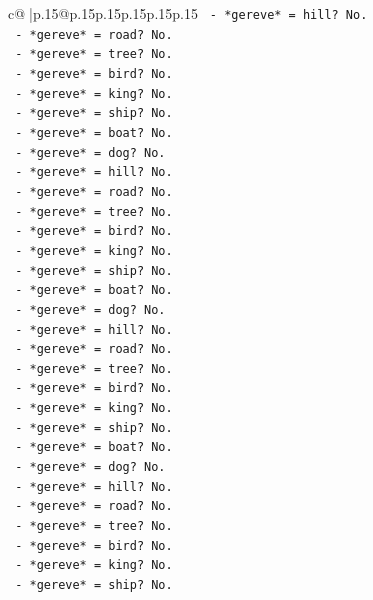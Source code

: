 \documentclass{article}
\begin{document}
{\begin{supertabular}{c@{$\;$}|p{.15\linewidth}@{}p{.15\linewidth}p{.15\linewidth}p{.15\linewidth}p{.15\linewidth}p{.15\linewidth}}
{{{\texttt{            {-} *gereve* = hill? No.} \\
\texttt{            {-} *gereve* = road? No.} \\
\texttt{            {-} *gereve* = tree? No.} \\
\texttt{            {-} *gereve* = bird? No.} \\
\texttt{            {-} *gereve* = king? No.} \\
\texttt{            {-} *gereve* = ship? No.} \\
\texttt{            {-} *gereve* = boat? No.} \\
\texttt{            {-} *gereve* = dog? No.} \\
\texttt{            {-} *gereve* = hill? No.} \\
\texttt{            {-} *gereve* = road? No.} \\
\texttt{            {-} *gereve* = tree? No.} \\
\texttt{            {-} *gereve* = bird? No.} \\
\texttt{            {-} *gereve* = king? No.} \\
\texttt{            {-} *gereve* = ship? No.} \\
\texttt{            {-} *gereve* = boat? No.} \\
\texttt{            {-} *gereve* = dog? No.} \\
\texttt{            {-} *gereve* = hill? No.} \\
\texttt{            {-} *gereve* = road? No.} \\
\texttt{            {-} *gereve* = tree? No.} \\
\texttt{            {-} *gereve* = bird? No.} \\
\texttt{            {-} *gereve* = king? No.} \\
\texttt{            {-} *gereve* = ship? No.} \\
\texttt{            {-} *gereve* = boat? No.} \\
\texttt{            {-} *gereve* = dog? No.} \\
\texttt{            {-} *gereve* = hill? No.} \\
\texttt{            {-} *gereve* = road? No.} \\
\texttt{            {-} *gereve* = tree? No.} \\
\texttt{            {-} *gereve* = bird? No.} \\
\texttt{            {-} *gereve* = king? No.} \\
\texttt{            {-} *gereve* = ship? No.} \\
}}}
\end{supertabular}}
\end{document}
